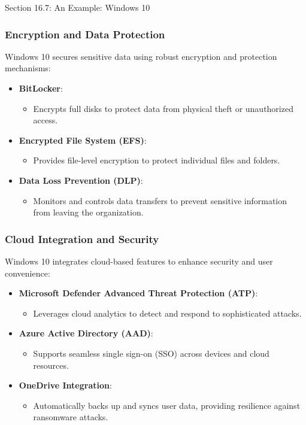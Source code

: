 \begin{notes}{Section 16.7: An Example: Windows 10}
    \subsubsection*{Encryption and Data Protection}
    
    Windows 10 secures sensitive data using robust encryption and protection mechanisms:
    \begin{itemize}
        \item \textbf{BitLocker}:
        \begin{itemize}
            \item Encrypts full disks to protect data from physical theft or unauthorized access.
        \end{itemize}
        \item \textbf{Encrypted File System (EFS)}:
        \begin{itemize}
            \item Provides file-level encryption to protect individual files and folders.
        \end{itemize}
        \item \textbf{Data Loss Prevention (DLP)}:
        \begin{itemize}
            \item Monitors and controls data transfers to prevent sensitive information from leaving the organization.
        \end{itemize}
    \end{itemize}
    
    \subsubsection*{Cloud Integration and Security}
    
    Windows 10 integrates cloud-based features to enhance security and user convenience:
    \begin{itemize}
        \item \textbf{Microsoft Defender Advanced Threat Protection (ATP)}:
        \begin{itemize}
            \item Leverages cloud analytics to detect and respond to sophisticated attacks.
        \end{itemize}
        \item \textbf{Azure Active Directory (AAD)}:
        \begin{itemize}
            \item Supports seamless single sign-on (SSO) across devices and cloud resources.
        \end{itemize}
        \item \textbf{OneDrive Integration}:
        \begin{itemize}
            \item Automatically backs up and syncs user data, providing resilience against ransomware attacks.
        \end{itemize}
    \end{itemize}
    

\end{notes}
